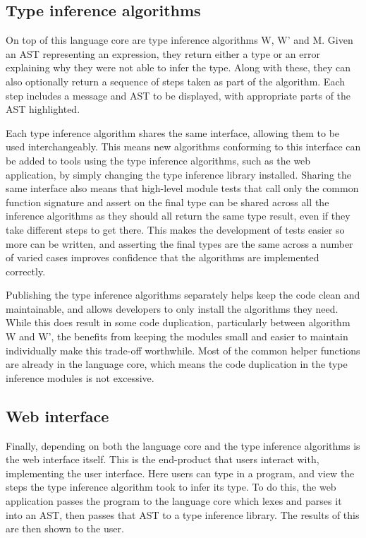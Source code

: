 \documentclass[a4paper,fleqn,oneside,12pt]{report}
\begin{document}
\subsection{Type inference algorithms}\label{id:h.75leuokwbltp}
On top of this language core are type inference algorithms W, W’ and M. Given an AST representing an expression, they return either a type or an error explaining why they were not able to infer the type. Along with these, they can also optionally return a sequence of steps taken as part of the algorithm. Each step includes a message and AST to be displayed, with appropriate parts of the AST highlighted.

Each type inference algorithm shares the same interface, allowing them to be used interchangeably. This means new algorithms conforming to this interface can be added to tools using the type inference algorithms, such as the web application, by simply changing the type inference library installed. Sharing the same interface also means that high-level module tests that call only the common function signature and assert on the final type can be shared across all the inference algorithms as they should all return the same type result, even if they take different steps to get there. This makes the development of tests easier so more can be written, and asserting the final types are the same across a number of varied cases improves confidence that the algorithms are implemented correctly.

Publishing the type inference algorithms separately helps keep the code clean and maintainable, and allows developers to only install the algorithms they need. While this does result in some code duplication, particularly between algorithm W and W’, the benefits from keeping the modules small and easier to maintain individually make this trade-off worthwhile. Most of the common helper functions are already in the language core, which means the code duplication in the type inference modules is not excessive.
\subsection{Web interface}\label{id:h.q67ivlz7h61r}
Finally, depending on both the language core and the type inference algorithms is the web interface itself. This is the end-product that users interact with, implementing the user interface. Here users can type in a program, and view the steps the type inference algorithm took to infer its type. To do this, the web application passes the program to the language core which lexes and parses it into an AST, then passes that AST to a type inference library. The results of this are then shown to the user.
\end{document}
